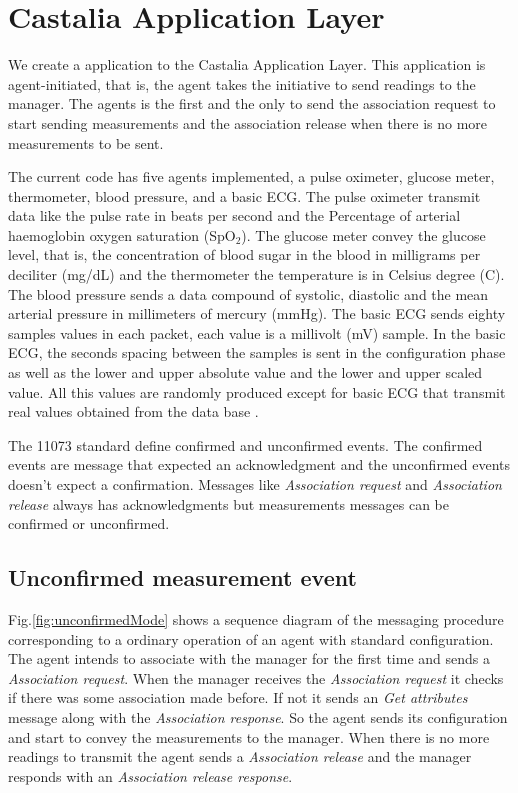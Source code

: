 \section{Castalia Application Layer}

We create a application to the Castalia Application Layer. This application is agent-initiated, that is, the agent takes the initiative to send readings to the manager. The agents is the first and the only to send the association request to start sending measurements and the association release when there is no more measurements to be sent.

The current code has five agents implemented, a pulse oximeter, glucose meter, thermometer, blood pressure, and a basic ECG. The pulse oximeter transmit data like the pulse rate in beats per second and the Percentage of arterial haemoglobin oxygen saturation (SpO$_2$). The glucose meter convey the glucose level, that is, the concentration of blood sugar in the blood in milligrams per deciliter (mg\//dL) and the thermometer the temperature is in Celsius degree (\textdegree C). The blood pressure sends a data compound of systolic, diastolic and the mean arterial pressure in millimeters of mercury (mmHg). The basic ECG sends eighty samples values in each packet, each value is a millivolt (mV) sample. In the basic ECG, the seconds spacing between the samples is sent in the configuration phase as well as the lower and upper absolute value and the lower and upper scaled value. All this values are randomly produced except for basic ECG that transmit real values obtained from the data base \cite{b2}. 

The 11073 standard define confirmed and unconfirmed events. The confirmed events are message that expected an acknowledgment and the unconfirmed events doesn't expect a confirmation. Messages like \textit{Association request} and \textit{Association release} always has acknowledgments but measurements messages can be confirmed or unconfirmed. %

\subsection{Unconfirmed measurement event}\label{sec:UnconfirmedMeasurementEvent}

Fig.\ref{fig:unconfirmedMode} shows a sequence diagram of the messaging procedure corresponding to a ordinary operation of an agent with standard configuration. The agent intends to associate with the manager for the first time and sends a \textit{Association request}. When the manager receives the \textit{Association request} it checks if there was some association made before. If not it sends an \textit{Get attributes} message along with the \textit{Association response}. So the agent sends its configuration and start to convey the measurements to the manager. When there is no more readings to transmit the agent sends a \textit{Association release} and the manager responds with an \textit{Association release response}.

